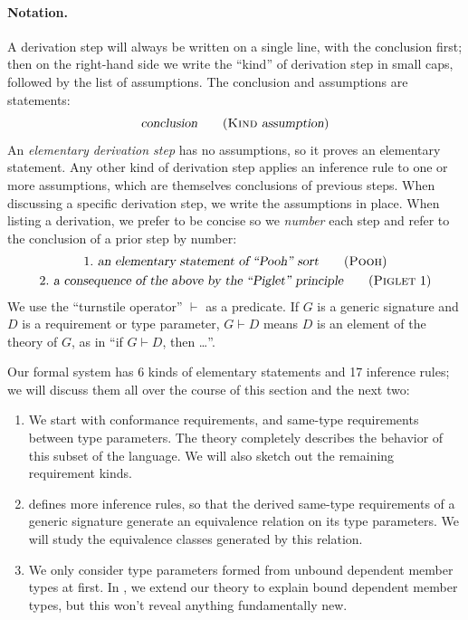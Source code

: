 \documentclass[../generics]{subfiles}
\begin{document}
\paragraph{Notation.} A derivation step will always be written on a single line, with the conclusion first; then on the right-hand side we write the ``kind'' of derivation step in small caps, followed by the list of assumptions. The conclusion and assumptions are statements:
\[\textsl{conclusion}\tag{\textsc{Kind} \textsl{assumption}}\]
An \emph{elementary derivation step} has no assumptions, so it proves an elementary statement. Any other kind of derivation step applies an inference rule to one or more assumptions, which are themselves conclusions of previous steps. When discussing a specific derivation step, we write the assumptions in place. When listing a derivation, we prefer to be concise so we \emph{number} each step and refer to the conclusion of a prior step by number:
\begin{gather*}
1.\ \textsl{an elementary statement of ``Pooh'' sort}\tag{\textsc{Pooh}}\\
2.\ \textsl{a consequence of the above by the ``Piglet'' principle}\tag{\textsc{Piglet} 1}
\end{gather*}
We use the ``turnstile operator'' $\vdash$ as a predicate. If $G$ is a generic signature and $D$ is a requirement or type parameter, \index{$\vdash$}$G\vdash D$ means $D$ is an element of the theory of $G$, as in ``if $G\vdash D$, then \ldots''.

Our formal system has 6 kinds of elementary statements and 17 inference rules; we will discuss them all over the course of this section and the next two:
\begin{enumerate}
\item We start with conformance requirements, and same-type requirements between type parameters. The theory completely describes the behavior of this subset of the language. We will also sketch out the remaining requirement kinds.
\item {} defines more inference rules, so that the derived same-type requirements of a generic signature generate an equivalence relation on its type parameters. We will study the equivalence classes generated by this relation.
\item We only consider type parameters formed from unbound dependent member types at first. In , we extend our theory to explain bound dependent member types, but this won't reveal anything fundamentally new.
\end{enumerate}
\end{document}

